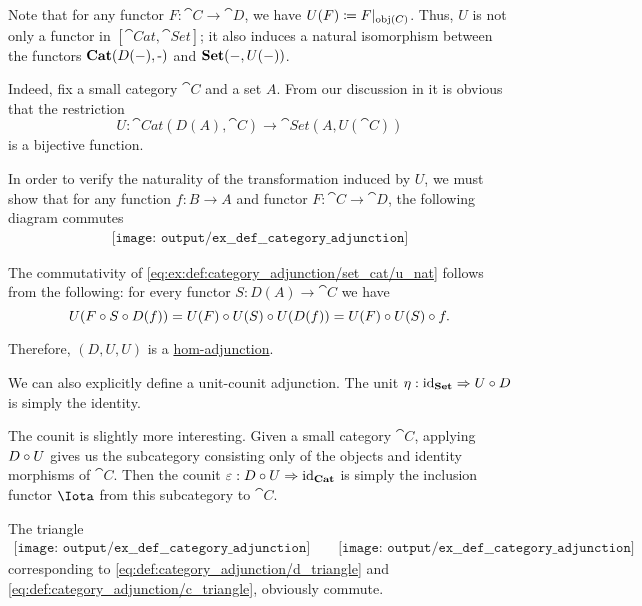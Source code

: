 \begin{example}
\begin{thmenum}
    Note that for any functor \( F: \cat{C} \to \cat{D} \), we have \( U(F) \coloneqq F\vert_{\operatorname{obj}(C)} \). Thus, \( U \) is not only a functor in \( [\cat{Cat}, \cat{Set}] \); it also induces a natural isomorphism between the functors \( \cat{Cat}(D(\anon*), \cat{\anon*}) \) and \( \cat{Set}(\anon*, U(\anon*)) \).

    Indeed, fix a small category \( \cat{C} \) and a set \( A \). From our discussion in  it is obvious that the restriction
    \begin{equation*}
      U: \cat{Cat}(D(A), \cat{C}) \to \cat{Set}(A, U(\cat{C}))
    \end{equation*}
    is a bijective function.

    In order to verify the naturality of the transformation induced by \( U \), we must show that for any function \( f: B \to A \) and functor \( F: \cat{C} \to \cat{D} \), the following diagram commutes
    \begin{equation}\label{eq:ex:def:category_adjunction/set_cat/u_nat}
      \begin{aligned}
        \texttt{[image: output/ex\_\_def\_\_category\_adjunction]}
      \end{aligned}
    \end{equation}

    The commutativity of \eqref{eq:ex:def:category_adjunction/set_cat/u_nat} follows from the following: for every functor \( S: D(A) \to \cat{C} \) we have
    \begin{equation*}
      U(F \bincirc S \bincirc D(f))
      =
      U(F) \bincirc U(S) \bincirc U(D(f))
      =
      U(F) \bincirc U(S) \bincirc f.
    \end{equation*}

    Therefore, \( (D, U, U) \) is a \hyperref[def:category_adjunction/hom]{hom-adjunction}.

    We can also explicitly define a unit-counit adjunction. The unit \( \eta: \id_{\cat{Set}} \Rightarrow U \bincirc D \) is simply the identity.

    The counit is slightly more interesting. Given a small category \( \cat{C} \), applying \( D \bincirc U \) gives us the subcategory consisting only of the objects and identity morphisms of \( \cat{C} \). Then the counit \( \varepsilon: D \bincirc U \Rightarrow \id_{\cat{Cat}} \) is simply the inclusion functor \( \Iota \) from this subcategory to \( \cat{C} \).

    The triangle
    \begin{equation}\label{eq:ex:def:category_adjunction/set_cat/triangles}
      \begin{aligned}
        \texttt{[image: output/ex\_\_def\_\_category\_adjunction]}
        \quad\quad
        \texttt{[image: output/ex\_\_def\_\_category\_adjunction]}
      \end{aligned}
    \end{equation}
    corresponding to \eqref{eq:def:category_adjunction/d_triangle} and \eqref{eq:def:category_adjunction/c_triangle}, obviously commute.


\end{thmenum}
\end{example}
